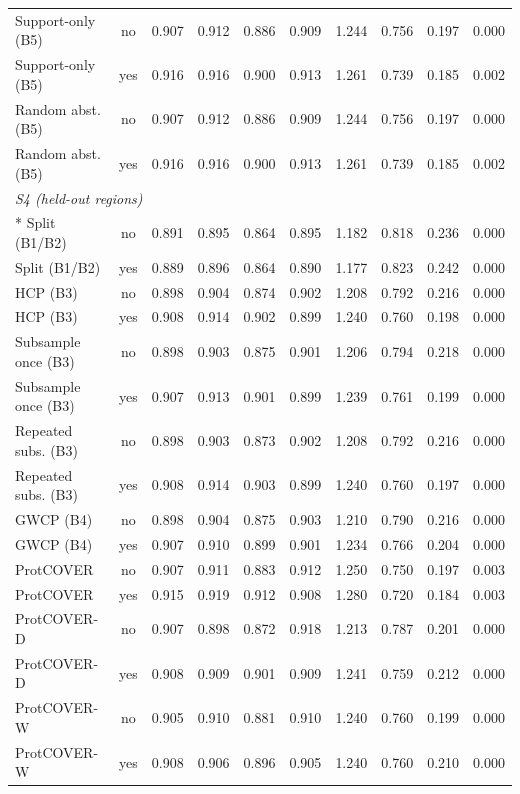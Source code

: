 \begin{longtable}{lccccccccc}
Support-only (B5) & no & 0.907 & 0.912 & 0.886 & 0.909 & 1.244 & 0.756 & 0.197 & 0.000 \\
Support-only (B5) & yes & 0.916 & 0.916 & 0.900 & 0.913 & 1.261 & 0.739 & 0.185 & 0.002 \\
Random abst. (B5) & no & 0.907 & 0.912 & 0.886 & 0.909 & 1.244 & 0.756 & 0.197 & 0.000 \\
Random abst. (B5) & yes & 0.916 & 0.916 & 0.900 & 0.913 & 1.261 & 0.739 & 0.185 & 0.002 \\
\midrule
\multicolumn{10}{l}{\emph{S4 (held-out regions)}}\\*
Split (B1/B2) & no & 0.891 & 0.895 & 0.864 & 0.895 & 1.182 & 0.818 & 0.236 & 0.000 \\
Split (B1/B2) & yes & 0.889 & 0.896 & 0.864 & 0.890 & 1.177 & 0.823 & 0.242 & 0.000 \\
HCP (B3) & no & 0.898 & 0.904 & 0.874 & 0.902 & 1.208 & 0.792 & 0.216 & 0.000 \\
HCP (B3) & yes & 0.908 & 0.914 & 0.902 & 0.899 & 1.240 & 0.760 & 0.198 & 0.000 \\
Subsample once (B3) & no & 0.898 & 0.903 & 0.875 & 0.901 & 1.206 & 0.794 & 0.218 & 0.000 \\
Subsample once (B3) & yes & 0.907 & 0.913 & 0.901 & 0.899 & 1.239 & 0.761 & 0.199 & 0.000 \\
Repeated subs. (B3) & no & 0.898 & 0.903 & 0.873 & 0.902 & 1.208 & 0.792 & 0.216 & 0.000 \\
Repeated subs. (B3) & yes & 0.908 & 0.914 & 0.903 & 0.899 & 1.240 & 0.760 & 0.197 & 0.000 \\
GWCP (B4) & no & 0.898 & 0.904 & 0.875 & 0.903 & 1.210 & 0.790 & 0.216 & 0.000 \\
GWCP (B4) & yes & 0.907 & 0.910 & 0.899 & 0.901 & 1.234 & 0.766 & 0.204 & 0.000 \\
ProtCOVER & no & 0.907 & 0.911 & 0.883 & 0.912 & 1.250 & 0.750 & 0.197 & 0.003 \\
ProtCOVER & yes & 0.915 & 0.919 & 0.912 & 0.908 & 1.280 & 0.720 & 0.184 & 0.003 \\
ProtCOVER-D & no & 0.907 & 0.898 & 0.872 & 0.918 & 1.213 & 0.787 & 0.201 & 0.000 \\
ProtCOVER-D & yes & 0.908 & 0.909 & 0.901 & 0.909 & 1.241 & 0.759 & 0.212 & 0.000 \\
ProtCOVER-W & no & 0.905 & 0.910 & 0.881 & 0.910 & 1.240 & 0.760 & 0.199 & 0.000 \\
ProtCOVER-W & yes & 0.908 & 0.906 & 0.896 & 0.905 & 1.240 & 0.760 & 0.210 & 0.000 \\

\end{longtable}
